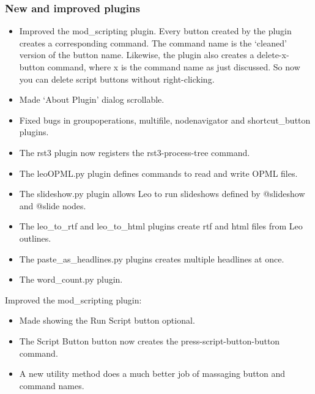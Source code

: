 \documentclass[a4paper,10pt,english]{sphinxmanual}
\begin{document}
\subsubsection{New and improved plugins}
\label{what-is-new:id20}\begin{itemize}
\item {} 
Improved the mod\_scripting plugin. Every button created by the plugin creates
a corresponding command. The command name is the `cleaned' version of the
button name. Likewise, the plugin also creates a delete-x-button command,
where x is the command name as just discussed. So now you can delete script
buttons without right-clicking.

\item {} 
Made `About Plugin' dialog scrollable.

\item {} 
Fixed bugs in groupoperations, multifile, nodenavigator and shortcut\_button plugins.

\item {} 
The rst3 plugin now registers the rst3-process-tree command.

\item {} 
The leoOPML.py plugin defines commands to read and write OPML files.

\item {} 
The slideshow.py plugin allows Leo to run slideshows defined by @slideshow and @slide nodes.

\item {} 
The leo\_to\_rtf and leo\_to\_html plugins create rtf and html files from Leo outlines.

\item {} 
The paste\_as\_headlines.py plugins creates multiple headlines at once.

\item {} 
The word\_count.py plugin.

\end{itemize}

Improved the mod\_scripting plugin:
\begin{itemize}
\item {} 
Made showing the Run Script button optional.

\item {} 
The Script Button button now creates the press-script-button-button command.

\item {} 
A new utility method does a much better job of massaging button and command names.

\end{itemize}
\end{document}
